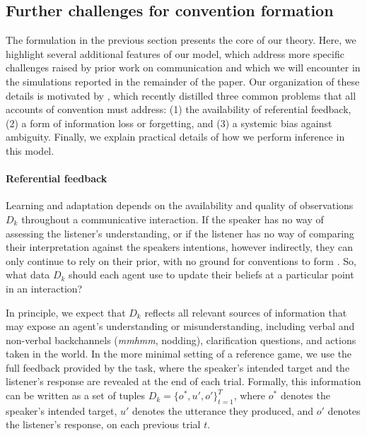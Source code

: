 \subsection{Further challenges for convention formation}

The formulation in the previous section presents the core of our theory.
Here, we highlight several additional features of our model, which address more specific challenges raised by prior work on communication and which we will encounter in the simulations reported in the remainder of the paper. 
Our organization of these details is motivated by , which recently distilled three common problems that all accounts of convention must address: (1) the availability of referential feedback, (2) a form of information loss or forgetting, and (3) a systemic bias against ambiguity.
Finally, we explain practical details of how we perform inference in this model. 

\paragraph{Referential feedback}

Learning and adaptation depends on the availability and quality of observations $D_k$ throughout a communicative interaction.
If the speaker has no way of assessing the listener's understanding, or if the listener has no way of comparing their interpretation against the speakers intentions, however indirectly, they can only continue to rely on their prior, with no ground for conventions to form  \cite{KraussWeinheimer66_Tangrams,HupetChantraine92_CollaborationOrRepitition,GarrodFayLeeOberlanderMacLeod07_GraphicalSymbolSystems}.
So, what data $D_k$ should each agent use to update their beliefs at a particular point in an interaction?

In principle, we expect that $D_k$ reflects all relevant sources of information that may expose an agent's understanding or misunderstanding, including verbal and non-verbal backchannels (\emph{mmhmm}, nodding), clarification questions, and actions taken in the world.
In the more minimal setting of a reference game, we use the full feedback provided by the task, where the speaker's intended target and the listener's response are revealed at the end of each trial. 
Formally, this information can be written as a set of tuples $D_k = \{o^*, u', o'\}_{t=1}^T$, where $o^*$ denotes the speaker's intended target, $u'$ denotes the utterance they produced, and $o'$ denotes the listener's response, on each previous trial $t$.

